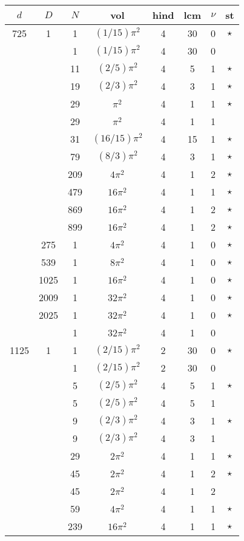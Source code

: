 \documentclass[12pt]{amsart}
\begin{document}
\begin{tabular}{ccc|ccccc}
$d$ & $D$ & $N$ & vol & hind & lcm & $\nu$ & st\\
\hline
725 & 1 & 1 & $(1/15)\pi^2$ & 4 & 30 & 0 & $\star$ \\
 &  & 1 & $(1/15)\pi^2$ & 4 & 30 & 0 &  \\
 &  & 11 & $(2/5)\pi^2$ & 4 & 5 & 1 & $\star$ \\
 &  & 19 & $(2/3)\pi^2$ & 4 & 3 & 1 & $\star$ \\
 &  & 29 & $\pi^2$ & 4 & 1 & 1 & $\star$ \\
 &  & 29 & $\pi^2$ & 4 & 1 & 1 &  \\
 &  & 31 & $(16/15)\pi^2$ & 4 & 15 & 1 & $\star$ \\
 &  & 79 & $(8/3)\pi^2$ & 4 & 3 & 1 & $\star$ \\
 &  & 209 & $4\pi^2$ & 4 & 1 & 2 & $\star$ \\
 &  & 479 & $16\pi^2$ & 4 & 1 & 1 & $\star$ \\
 &  & 869 & $16\pi^2$ & 4 & 1 & 2 & $\star$ \\
 &  & 899 & $16\pi^2$ & 4 & 1 & 2 & $\star$ \\
 & 275 & 1 & $4\pi^2$ & 4 & 1 & 0 & $\star$ \\
 & 539 & 1 & $8\pi^2$ & 4 & 1 & 0 & $\star$ \\
 & 1025 & 1 & $16\pi^2$ & 4 & 1 & 0 & $\star$ \\
 & 2009 & 1 & $32\pi^2$ & 4 & 1 & 0 & $\star$ \\
 & 2025 & 1 & $32\pi^2$ & 4 & 1 & 0 & $\star$ \\
 &  & 1 & $32\pi^2$ & 4 & 1 & 0 &  \\
1125 & 1 & 1 & $(2/15)\pi^2$ & 2 & 30 & 0 & $\star$ \\
 &  & 1 & $(2/15)\pi^2$ & 2 & 30 & 0 &  \\
 &  & 5 & $(2/5)\pi^2$ & 4 & 5 & 1 & $\star$ \\
 &  & 5 & $(2/5)\pi^2$ & 4 & 5 & 1 &  \\
 &  & 9 & $(2/3)\pi^2$ & 4 & 3 & 1 & $\star$ \\
 &  & 9 & $(2/3)\pi^2$ & 4 & 3 & 1 &  \\
 &  & 29 & $2\pi^2$ & 4 & 1 & 1 & $\star$ \\
 &  & 45 & $2\pi^2$ & 4 & 1 & 2 & $\star$ \\
 &  & 45 & $2\pi^2$ & 4 & 1 & 2 &  \\
 &  & 59 & $4\pi^2$ & 4 & 1 & 1 & $\star$ \\
 &  & 239 & $16\pi^2$ & 4 & 1 & 1 & $\star$ \\

\end{tabular}
\end{document}
